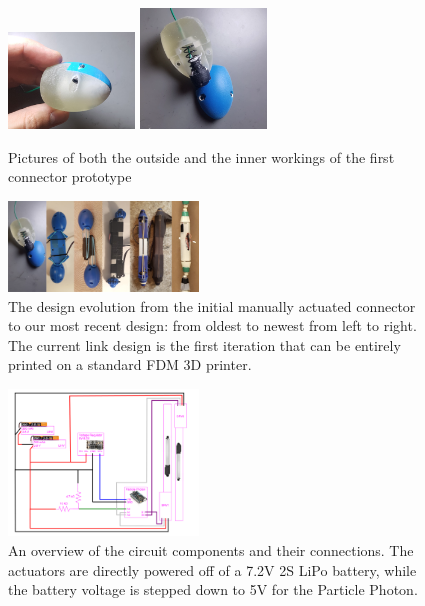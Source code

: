 \documentclass[letterpaper, 10 pt, conference]{ieeeconf}  %
\begin{document}
 \begin{figure}
\centering
\includegraphics[width=0.3\textwidth]{media/V1_3.png}
\includegraphics[width=0.3\textwidth]{media/V1_4.png}
   \caption{\label{v1img}  Pictures of both the outside and the inner workings of the first connector prototype}
\end{figure}

\begin{figure}
\centering
\includegraphics[width=0.45\textwidth]{media/RobotEvolution.png}
   \caption{\label{evolution} The design evolution from the initial manually actuated connector to our most recent design: from oldest to newest from left to right. The current link design is the first iteration that can be entirely printed on a standard FDM 3D printer.}
\end{figure}

\begin{figure}
\centering
\includegraphics[width=0.45\textwidth]{media/DetailWiringDiagram.png}
   \caption{\label{wiring} An overview of the circuit components and their connections. The actuators are directly powered off of a 7.2V 2S LiPo battery, while the battery voltage is stepped down to 5V for the Particle Photon.}
\end{figure}
\end{document}
